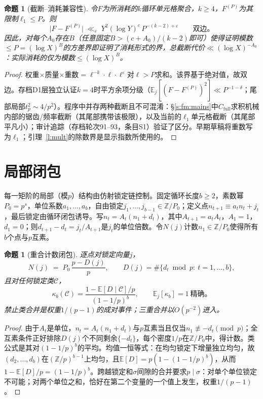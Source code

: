 \documentclass[11pt]{article}
\numberwithin{equation}{section}
\newtheorem{proposition}[theorem]{命题}
\theoremstyle{definition}
\theoremstyle{remark}
\begin{document}
\begin{proposition}[截断--消耗兼容性]\label{p:consume}
令$F$为所消耗的$k$循环单元格聚合，$k\ge4$，$F^{(P)}$为其限制$\ell_1\le P$。则
\[
\bigl|F-F^{(P)}\bigr|\;\ll_{\varepsilon}\;
Y^{2}(\log Y)^{c}\,P^{-(k-2)+\varepsilon}
\qquad\text{双边。}
\]
因此，对每个$A_0$存在$B$（任意固定$B>(c+A_0)/(k-2)$即可）使得证明模数$\le P=(\log X)^{B}$的方差界即证明了消耗形式的界，总截断代价$\ll(\log X)^{-A_0}$：实际消耗的仅为模数$\le(\log X)^{B}$。
\end{proposition}

\begin{proof}
权重$\times$质量$\times$重数$=\ell^{-k}\cdot\ell\cdot\ell^{\varepsilon}$对$\ell>P$求和。该界基于绝对值，故双边。存档D1层独立认证$k=4$时平方余项分级（$\mathbb E_j[(F-F^{(P)})^2]\ll P^{-1-\delta}$；尾部局部$t_p^{2}\sim4/p^{2}$）。程序中并存两种截断且不可混淆：\S\ref{s:fm:mains}中$C_{\mathrm{full}}$求积机械内部的锯齿/频率截断（其尾部携带该极限），以及当前的$\ell_1$单元格截断（其尾部平凡小）；审计追踪（存档轮次91--93，条目S1）验证了区分。早期草稿将重数写为$\ell_1$；引理~\ref{l:mult}的除数界是显示指数所使用的。
\end{proof}

\section{局部闭包}\label{s:local}

每一矩阶的局部（模$p$）结构由仿射锁定链控制。固定循环长度$b\ge2$，素数幂$P_0=p^{s}$，单位系数$a_1,\dots,a_b$，自由锁定$j_1,\dots,j_{b-1}\in\mathbb Z/P_0$；定义点$n_{t+1}\equiv a_tn_t+j_t$，最后锁定由循环闭包诱导。写$n_t=A_t(n_1+d_t)$，其中$A_{t+1}=a_tA_t$，$A_1=1$，$d_1=0$；则$d_{t+1}-d_t=j_t/A_{t+1}$是$j_t$的单位倍数。令$N(j)$计数$n_1\in\mathbb Z/P_0$使得所有$b$个点与$p$互素。

\begin{proposition}[重合计数闭包]\label{p:local}
逐点对锁定向量$j$，
\[
N(j)\;=\;P_0\,\frac{p-D(j)}{p},
\qquad
D(j)=\#\{d_t\bmod p:\ t=1,\dots,b\},
\]
且对任何锁定类$\mathcal C$，
\[
\kappa_b(\mathcal C)
=\frac{1-\mathbb E[D\mid\mathcal C]/p}{(1-1/p)^{b}},
\qquad
\mathbb E_j[\kappa_b]=1\ \text{精确。}
\]
禁止类合并是权重$1/(p-1)$的成对事件；三重合并以$O(p^{-2})$进入。
\end{proposition}

\begin{proof}
由于$A_t$是单位，$n_t=A_t(n_1+d_t)$与$p$互素当且仅当$n_1\not\equiv-d_t\pmod p$；全互素条件正好排除$D(j)$个不同剩余$\{-d_t\}$，每个密度$1/p$在$\mathbb Z/P_0$中，得计数。类公式是其对$(1-1/p)^{b}$的平均。均值一恒等式：在均匀锁定下增量独立均匀，故$(d_2,\dots,d_b)$在$(\mathbb Z/p)^{b-1}$上均匀，且$\mathbb E[D]=p(1-(1-1/p)^{b})$，从而$1-\mathbb E[D]/p=(1-1/p)^{b}$。跨越锁定和$\sigma$间隙的合并要求$p\mid\sigma$：对单个单位锁定不可能；对两个单位之和，恰好在第二个变量的一个值上发生，权重$1/(p-1)$。
\end{proof}
\end{document}
